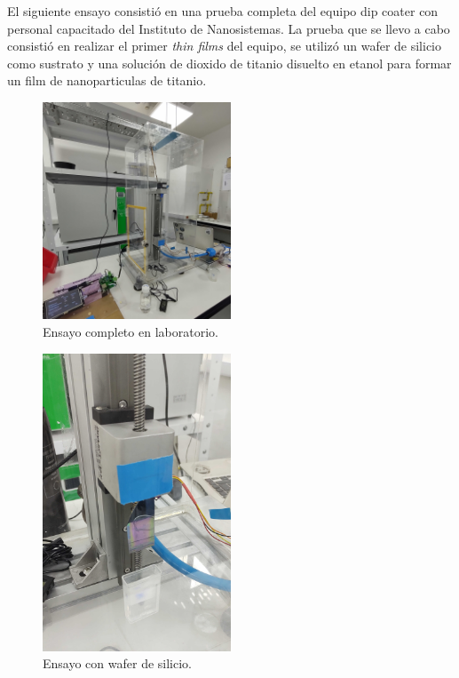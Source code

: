 El siguiente ensayo consistió en una prueba completa del equipo dip coater con personal capacitado del Instituto de Nanosistemas.
La prueba que se llevo a cabo consistió en realizar el primer \textit{thin films} del equipo, se utilizó un wafer de silicio como sustrato y una solución de dioxido de titanio disuelto en etanol para formar un film de nanoparticulas de titanio.

\begin{figure}[h]
\centering 
\includegraphics[width=0.5\textwidth]{./Figures/prueba_b.jpg}
\caption{Ensayo completo en laboratorio.}
\label{fig:desplazamiento_lineal}
\end{figure}


\begin{figure}[h]
\centering 
\includegraphics[width=0.5\textwidth]{./Figures/prueba_a.jpg}
\caption{Ensayo con wafer de silicio.}
\label{fig:desplazamiento_lineal}
\end{figure}


